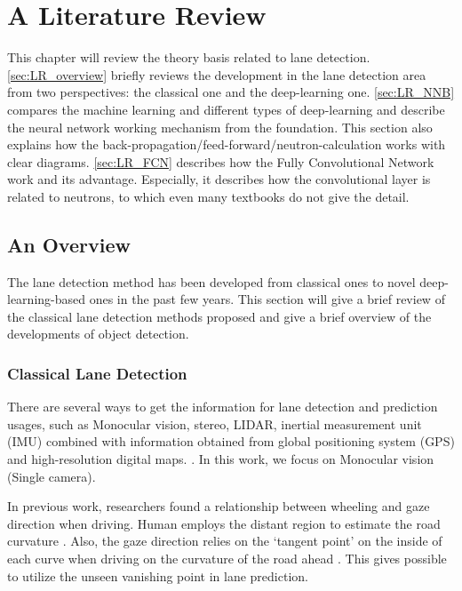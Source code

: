 
\chapter{A Literature Review}
\label{cha:literature}
\begin{spacing}{1.5}
\setlength{\parskip}{0.3in}

This chapter will review the theory basis related to lane detection. \autoref{sec:LR_overview} briefly reviews the development in the lane detection area from two perspectives: the classical one and the deep-learning one. \autoref{sec:LR_NNB} compares the machine learning and different types of deep-learning and describe the neural network working mechanism from the foundation. This section also explains how the back-propagation/feed-forward/neutron-calculation works with clear diagrams. \autoref{sec:LR_FCN} describes how the Fully Convolutional Network work and its advantage. Especially, it describes how the convolutional layer is related to neutrons, to which even many textbooks do not give the detail.

\section{An Overview}
\label{sec:LR_overview}

The lane detection method has been developed from classical ones to novel deep-learning-based ones in the past few years. This section will give a brief review of the classical lane detection methods proposed and give a brief overview of the developments of object detection.

\subsection{Classical Lane Detection}

There are several ways to get the information for lane detection and prediction usages, such as Monocular vision, stereo, LIDAR, inertial measurement unit (IMU) combined with information obtained from global positioning system (GPS) and high-resolution digital maps. \cite{hillel2014recent}. In this work, we focus on Monocular vision (Single camera).

In previous work, researchers found a relationship between wheeling and gaze direction when driving. Human employs the distant region to estimate the road curvature \cite{land1995parts}. Also, the gaze direction relies on the `tangent point' on the inside of each curve when driving on the curvature of the road ahead \cite{land1994we}. This gives possible to utilize the unseen vanishing point in lane prediction.


\end{spacing}

